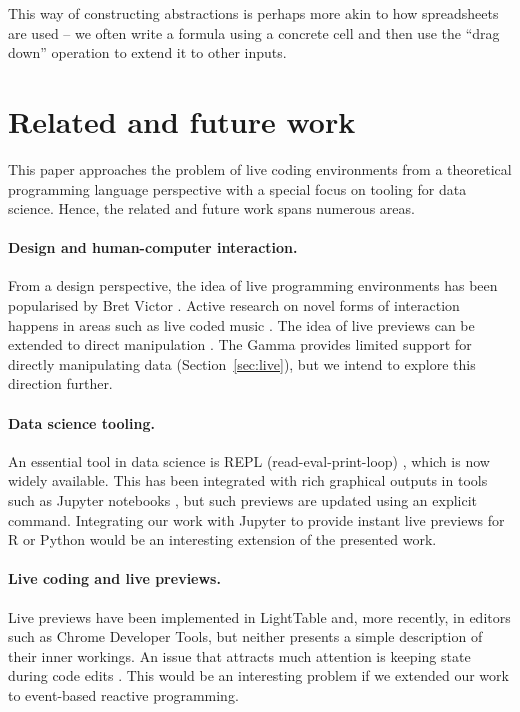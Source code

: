 \documentclass[sigplan,10pt]{acmart}\settopmatter{printfolios=true,printccs=false,printacmref=false}
\theoremstyle{plain}
\theoremstyle{definition}
\begin{document}
This way of constructing abstractions is perhaps more akin to how spreadsheets are used -- we often
write a formula using a concrete cell and then use the ``drag down'' operation to extend it to 
other inputs.


\section{Related and future work}
\label{sec:future}

This paper approaches the problem of live coding environments from a theoretical programming
language perspective with a special focus on tooling for data science. Hence, the related and
future work spans numerous areas.

\paragraph{Design and human-computer interaction.}
From a design perspective, the idea of live programming environments has been popularised by 
Bret Victor \cite{learnable}. Active research on novel forms of interaction happens in areas
such as live coded music \cite{beyond,sonic}.
The idea of live previews can be extended to direct manipulation \cite{direct}. The Gamma
provides limited support for directly manipulating data (Section~\ref{sec:live}), but we 
intend to explore this direction further.

\paragraph{Data science tooling.}
An essential tool in data science is REPL (read-eval-print-loop) \cite{drscheme}, which is now
widely available. This has been integrated with rich graphical outputs in tools such as Jupyter
notebooks \cite{jupyter,ipython}, but such previews are updated using an explicit command.
Integrating our work with Jupyter to provide instant live previews for R or Python would be
an interesting extension of the presented work.

\paragraph{Live coding and live previews.}
Live previews have been implemented in LightTable \cite{lighttable} and, more recently, in
editors such as Chrome Developer Tools, but neither presents a simple description of their
inner workings. An issue that attracts much attention is keeping state during code edits
\cite{alive,livingit}. This would be an interesting problem if we extended our work to
event-based reactive programming.
\end{document}
